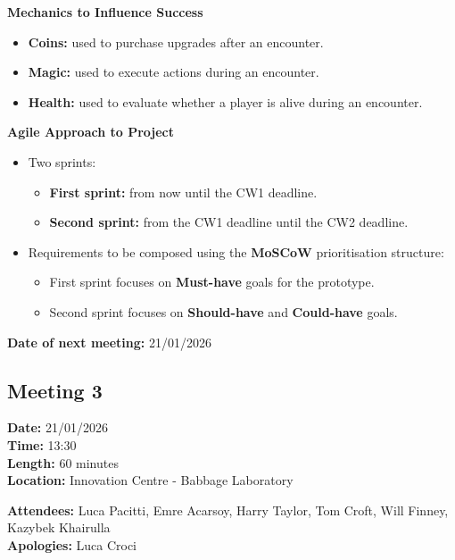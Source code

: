 \documentclass[11pt]{article}
\begin{document}
    \textbf{Mechanics to Influence Success}
    \begin{itemize}
        \item \textbf{Coins:} used to purchase upgrades after an encounter.
        \item \textbf{Magic:} used to execute actions during an encounter.
        \item \textbf{Health:} used to evaluate whether a player is alive during an encounter.
    \end{itemize}

    \textbf{Agile Approach to Project}
    \begin{itemize}
        \item Two sprints:
        \begin{itemize}
            \item \textbf{First sprint:} from now until the CW1 deadline.
            \item \textbf{Second sprint:} from the CW1 deadline until the CW2 deadline.
        \end{itemize}

        \item Requirements to be composed using the \textbf{MoSCoW} prioritisation structure:
        \begin{itemize}
            \item First sprint focuses on \textbf{Must-have} goals for the prototype.
            \item Second sprint focuses on \textbf{Should-have} and \textbf{Could-have} goals.
        \end{itemize}
    \end{itemize}

    \textbf{Date of next meeting:} 21/01/2026



    \vspace{1.5\baselineskip}
    \subsection{Meeting 3}

    \textbf{Date:} 21/01/2026 \\
    \textbf{Time:} 13:30 \\
    \textbf{Length:} 60 minutes \\
    \textbf{Location:} Innovation Centre - Babbage Laboratory

    \textbf{Attendees:} Luca Pacitti, Emre Acarsoy, Harry Taylor, Tom Croft, Will Finney, Kazybek Khairulla \\
    \textbf{Apologies:} Luca Croci
\end{document}
